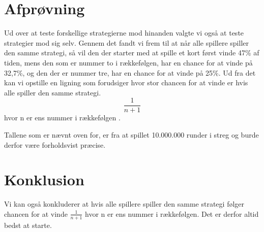 \documentclass[a4paper, 12pt]{article}
\begin{document}
\begin{multicols}{2}
\section{Afprøvning}
Ud over at teste forskellige strategierne mod hinanden valgte vi også at teste strategier mod sig selv. Gennem det fandt vi frem til at når alle spillere spiller den samme strategi, så vil den der starter med at spille et kort først vinde 47\% af tiden, mens den som er nummer to i rækkefølgen, har en chance for at vinde på 32,7\%, og den der er nummer tre, har en chance for at vinde på 25\%. Ud fra det kan vi opstille en ligning som forudsiger hvor stor chancen for at vinde er hvis alle spiller den samme strategi.
$$\frac{1}{n+1}$$ hvor n er ens nummer i rækkefølgen . 

Tallene som er nævnt oven for, er fra at spillet 10.000.000 runder i streg og burde derfor være forholdsvist præcise. 

\section{Konklusion}


Vi kan også konkluderer at hvis alle spillere spiller den samme strategi følger chancen for at vinde $\frac{1}{n+1}$ hvor n er ens nummer i rækkefølgen. Det er derfor altid bedst at starte.
\bigbreak

\vfill
\pagebreak

\end{multicols}
\end{document}
